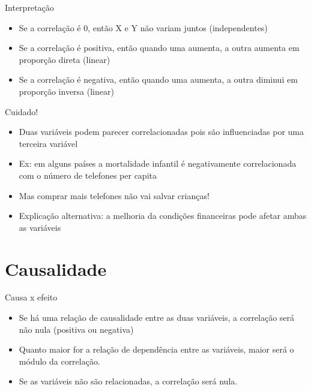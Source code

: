 \documentclass{beamer}
\begin{document}
\begin{frame}{Interpretação}
  \begin{itemize}
  \item Se a correlação é 0, então X e Y não variam juntos (independentes)
  \item Se a correlação é positiva, então quando uma aumenta, a outra
    aumenta em proporção direta (linear)
  \item Se a correlação é negativa, então quando uma aumenta, a outra
    diminui em proporção inversa (linear)
  \end{itemize}
\end{frame}


\begin{frame}{Cuidado!}
  \begin{itemize}
  \item Duas variáveis podem \alert{parecer} correlacionadas pois são
    influenciadas por uma terceira variável
  \item Ex: em alguns países a mortalidade infantil é negativamente
    correlacionada com o número de telefones per capita
  \item Mas comprar mais telefones não vai salvar crianças!
  \item Explicação alternativa: a melhoria da condições financeiras
    pode afetar ambas as variáveis
  \end{itemize}
\end{frame}

\section{Causalidade}


\begin{frame}{Causa x efeito}
  \begin{itemize}
  \item Se há uma relação de causalidade entre as duas variáveis, a
    correlação será não nula (positiva ou negativa)
  \item Quanto maior for a relação de dependência entre as variáveis,
    maior será o módulo da correlação.
  \item Se as variáveis não são relacionadas, a correlação será nula.
  \end{itemize}
\end{frame}
\end{document}
